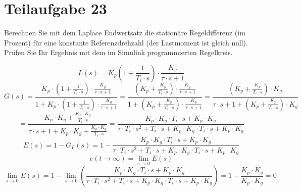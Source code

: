 \section{Teilaufgabe 23}
\begin{aufgabe}
    Berechnen Sie mit dem Laplace Endwertsatz die stationäre Regeldifferenz 
    (im Prozent) für eine konstante Referenzdrehzahl (der Lastmoment ist 
    gleich null).  Prüfen Sie Ihr Ergebnis mit dem im Simulink programmierten 
    Regelkreis.
\end{aufgabe}
\[ L(s) = K_p \left(1 + \frac{1}{T_i \cdot s}\right) 
    \cdot \frac{K_g}{\tau \cdot s + 1} \]
\[ G(s) = \frac{K_p \cdot \left(1 + \frac{1}{T_i \cdot s}\right) 
        \cdot \frac{K_g}{\tau \cdot s + 1}}
        {1 + K_p \cdot \left(1 + \frac{1}{T_i \cdot s}\right) 
        \cdot \frac{K_g} {\tau \cdot s + 1}}
    = \frac{\left(K_p + \frac{K_p}{T_i \cdot s}\right) 
        \cdot \frac{K_g}{\tau \cdot s + 1}}
        {1 + \left(K_p + \frac{K_p}{T_i \cdot s}\right) 
        \cdot \frac{K_g} {\tau \cdot s + 1}}
    = \frac{\left(K_p + \frac{K_p}{T_i \cdot s}\right) 
        \cdot K_g}
        {\tau \cdot s + 1 + \left(K_p + \frac{K_p}{T_i \cdot s}\right) 
        \cdot K_g}
\]
\[  = \frac{K_p \cdot K_g + \frac{K_p \cdot K_g}{T_i \cdot s}}
        {\tau \cdot s + 1 + K_p \cdot K_g + \frac{K_p \cdot K_g}{T_i \cdot s}}
    = \frac{K_p \cdot K_g \cdot T_i \cdot s + K_p \cdot K_g}
        {\tau \cdot T_i \cdot s^2 + T_i \cdot s 
        + K_p \cdot K_g \cdot T_i \cdot s + K_p \cdot K_g}
\]
\[ E(s) = 1 - G_F(s) = 1 - \frac{K_p \cdot K_g \cdot T_i \cdot s + K_p \cdot K_g}
        {\tau \cdot T_i \cdot s^2 + T_i \cdot s
        + K_p \cdot K_g \cdot T_i \cdot s + K_p \cdot K_g}
\]
\[ e(t \to \infty) = \lim\limits_{s \to 0} E(s) \]
\[ \lim\limits_{s \to 0} E(s) = 1 - \lim\limits_{s \to 0} 
        \left(\frac{K_p \cdot K_g \cdot T_i \cdot s + K_p \cdot K_g}
        {\tau \cdot T_i \cdot s^2 + T_i \cdot s 
        + K_p \cdot K_g \cdot T_i \cdot s + K_p \cdot K_g}\right)
    = 1 - \frac{K_p \cdot K_g}{K_p \cdot K_g}
    = 0
\]
